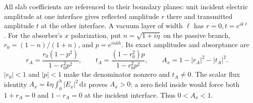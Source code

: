 \documentclass[11pt]{article}
\newcommand{\dd}{\,\mathrm{d}}
\newcommand{\abs}[1]{\lvert #1\rvert}
\begin{document}
All slab coefficients are referenced to their boundary planes: unit incident electric amplitude at one interface gives reflected amplitude $r$ there and transmitted amplitude $t$ at the other interface. A vacuum layer of width $\ell$ has $r=0,t=e^{ik\ell}$. For the absorber's $x$ polarization, put $n=\sqrt{1+i\eta}$ on the passive branch, $r_0=(1-n)/(1+n)$, and $p=e^{inkh}$. Its exact amplitudes and absorptance are
\begin{equation}\label{eq:absorber}
 r_A=\frac{r_0(1-p^2)}{1-r_0^2p^2},\qquad
 t_A=\frac{(1-r_0^2)p}{1-r_0^2p^2},\qquad
 A_x=1-\abs{r_A}^2-\abs{t_A}^2.
\end{equation}
$\abs{r_0}<1$ and $\abs p<1$ make the denominator nonzero and $t_A\ne0$. The scalar flux identity $A_x=k\eta\int_0^h\abs{E_x}^2\dd z$ proves $A_x>0$: a zero field inside would force both $1+r_A=0$ and $1-r_A=0$ at the incident interface. Thus $0<A_x<1$.
\end{document}
